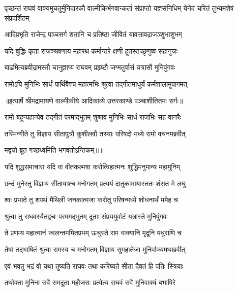 \threelineshloka
{पृच्छन्तं राघवं वाक्यमूचतुर्मुनिदारकौ}
{वाल्मीकिर्भगवान्कर्ता संप्राप्तो यज्ञसंनिधिम्}
{येनेदं चरितं तुभ्यमशेषं संप्रदर्शितम्} %

\twolineshloka
{आदिप्रभृति राजेन्द्र पञ्चसर्ग शतानि च}
{प्रतिष्ठा जीवितं यावत्तावद्राजञ्शुभाशुभम्} %

\twolineshloka
{यदि बुद्धिः कृता राजञ्श्रवणाय महारथ}
{कर्मान्तरे क्षणी हूतस्तच्छृणुष्व सहानुजः} %

\twolineshloka
{बाढमित्यब्रवीद्रामस्तौ चानुज्ञाप्य राघवम्}
{प्रहृष्टौ जग्मतुर्वासं यत्रासौ मुनिपुंगवः} %

\twolineshloka
{रामोऽपि मुनिभिः सार्धं पार्थिवैश्च महात्मभिः}
{श्रुत्वा तद्गीतमाधुर्यं कर्मशालामुपागमत्} %


{॥इत्यार्षे श्रीमद्रामायणे वाल्मीकीये आदिकाव्ये उत्तरकाण्डे पञ्चाशीतितमः सर्गः॥}


\twolineshloka
{रामो बहून्यहान्येव तद्गीतं परमाद्भुतम्}
{शुश्राव मुनिभिः सार्धं राजभिः सह वानरैः} %

\twolineshloka
{तस्मिन्गीते तु विज्ञाय सीतापुत्रौ कुशीलवौ}
{तस्याः परिषदो मध्ये रामो वचनमब्रवीत्} %

{मद्वचो ब्रूत गच्छध्वमिति भगवतोऽन्तिकम्॥॥} %

\addtocounter{shlokacount}{1}

\twolineshloka
{यदि शुद्धसमाचारा यदि वा वीतकल्मषा}
{करोत्विहात्मनः शुद्धिमनुमान्य महामुनिम्} %

\twolineshloka
{छन्दं मुनेस्तु विज्ञाय सीतायाश्च मनोगतम्}
{प्रत्ययं दातुकामायास्ततः शंसत मे लघु} %

\twolineshloka
{श्वः प्रभाते तु शपथं मैथिली जनकात्मजा}
{करोतु परिषन्मध्ये शोधनार्थं ममेह च} %

\twolineshloka
{श्रुत्वा तु राघवस्यैतद्वचः परममद्भुतम्}
{दूताः संप्रययुर्वाटं यत्रास्ते मुनिपुंगवः} %

\twolineshloka
{ते प्रणम्य महात्मानं ज्वलन्तममितप्रभम्}
{ऊचुस्ते राम वाक्यानि मृदूनि मधुराणि च} %

\twolineshloka
{तेषां तद्भाषितं श्रुत्वा रामस्य च मनोगतम्}
{विज्ञाय सुमहातेजा मुनिर्वाक्यमथाब्रवीत्} %

\twolineshloka
{एवं भवतु भद्रं वो यथा तुष्यति राघवः}
{तथा करिष्यते सीता दैवतं हि पतिः स्त्रियाः} %

\twolineshloka
{तथोक्ता मुनिना सर्वे रामदूता महौजसः}
{प्रत्येत्य राघवं सर्वे मुनिवाक्यं बभाषिरे} %

